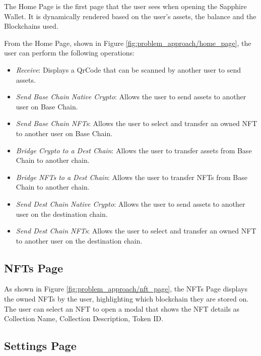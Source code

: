 
The Home Page is the first page that the user sees when opening the Sapphire Wallet. It is dynamically rendered based on the user's assets, the balance and the Blockchains used.

From the Home Page, shown in Figure \ref{fig:problem_approach/home_page}, the user can perform the following operations:
\begin{itemize}
    \item \textit{Receive}: Displays a QrCode that can be scanned by another user to send assets.
    \item \textit{Send Base Chain Native Crypto}: Allows the user to send assets to another user on Base Chain.
    \item \textit{Send Base Chain NFTs}: Allows the user to select and transfer an owned NFT to another user on Base Chain.
    \item \textit{Bridge Crypto to a Dest Chain}: Allows the user to transfer assets from Base Chain to another chain.
    \item \textit{Bridge NFTs to a Dest Chain}: Allows the user to transfer NFTs from Base Chain to another chain.
    \item \textit{Send Dest Chain Native Crypto}: Allows the user to send assets to another user on the destination chain.
    \item \textit{Send Dest Chain NFTs}: Allows the user to select and transfer an owned NFT to another user on the destination chain.
\end{itemize}



\subsection{NFTs Page}
\label{subsec:nfts_page}

As shown in Figure \ref{fig:problem_approach/nft_page}, the NFTs Page displays the owned NFTs by the user, highlighting which blockchain they are stored on. The user can select an NFT to open a modal that shows the NFT details as Collection Name, Collection Description, Token ID. 


\subsection{Settings Page}
\label{subsec:settings_page}

